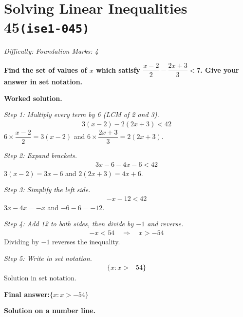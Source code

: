 \documentclass[11pt]{article}
\newcommand{\question}[1]{\par\medskip\noindent\textbf{#1}\par}
\begin{document}
\section*{Solving Linear Inequalities 45\quad\small\texttt{(ise1-045)}}
\textit{Difficulty: Foundation \quad\textbar\quad Marks: 4}

\question{Find the set of values of \( x \) which satisfy \( \dfrac{x - 2}{2} - \dfrac{2x + 3}{3} < 7 \). Give your answer in set notation.}

\textbf{Worked solution.}

\textit{Step 1: Multiply every term by 6 (LCM of 2 and 3).}
\[\begin{gathered}
3(x - 2) - 2(2x + 3) < 42
\end{gathered}\]
\( 6 \times \dfrac{x-2}{2} = 3(x-2) \) and \( 6 \times \dfrac{2x+3}{3} = 2(2x+3) \).

\textit{Step 2: Expand brackets.}
\[\begin{gathered}
3x - 6 - 4x - 6 < 42
\end{gathered}\]
\( 3(x-2) = 3x-6 \) and \( 2(2x+3) = 4x+6 \).

\textit{Step 3: Simplify the left side.}
\[\begin{gathered}
-x - 12 < 42
\end{gathered}\]
\( 3x - 4x = -x \) and \( -6 - 6 = -12 \).

\textit{Step 4: Add 12 to both sides, then divide by \(-1\) and reverse.}
\[\begin{gathered}
-x < 54 \quad \Rightarrow \quad x > -54
\end{gathered}\]
Dividing by \(-1\) reverses the inequality.

\textit{Step 5: Write in set notation.}
\[\begin{gathered}
\{x : x > -54\}
\end{gathered}\]
Solution in set notation.

\begin{answerbox}
\textbf{Final answer:}\quad \(\displaystyle  \{x : x > -54\} \)
\end{answerbox}
\textbf{Solution on a number line.}
\end{document}
